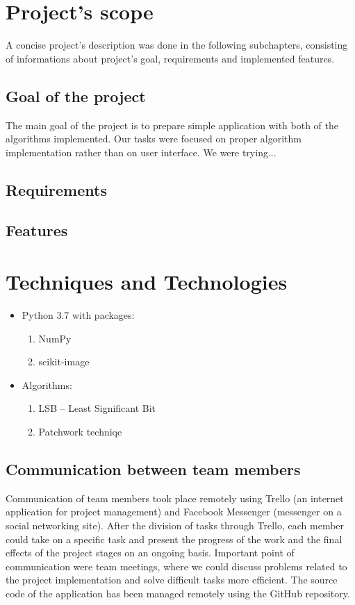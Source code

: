\documentclass[a4paper, 12pt]{article}
\begin{document}
\section{Project's scope}

A concise project's description was done in the following subchapters, consisting of informations about project's goal, requirements and implemented features.

\subsection{Goal of the project}
The main goal of the project is to prepare simple application with both of the algorithms implemented. Our tasks were focused on proper algorithm implementation rather than on user interface. We were trying...

\subsection{Requirements}

\subsection{Features}

\section{Techniques and Technologies}
	
	\begin{itemize}
		\item Python 3.7 with packages:
		\begin{enumerate}
            \item NumPy
            \item scikit-image
        \end{enumerate}
		\item Algorithms: \begin{enumerate}
			\item LSB – Least Significant Bit
			\item Patchwork techniqe
		\end{enumerate}
	\end{itemize}
	
\subsection{Communication between team members}
Communication of team members took place remotely using Trello (an internet
application for project management) and Facebook Messenger (messenger on a social
networking site). After the division of tasks through Trello, each member could take on	a specific task and present the progress of the work and the final effects of the project stages on an ongoing basis. Important point of communication were team meetings, where we could discuss problems related to the project implementation and solve difficult tasks more efficient. The source code of the application has been managed remotely using the GitHub repository.
	
\end{document}
